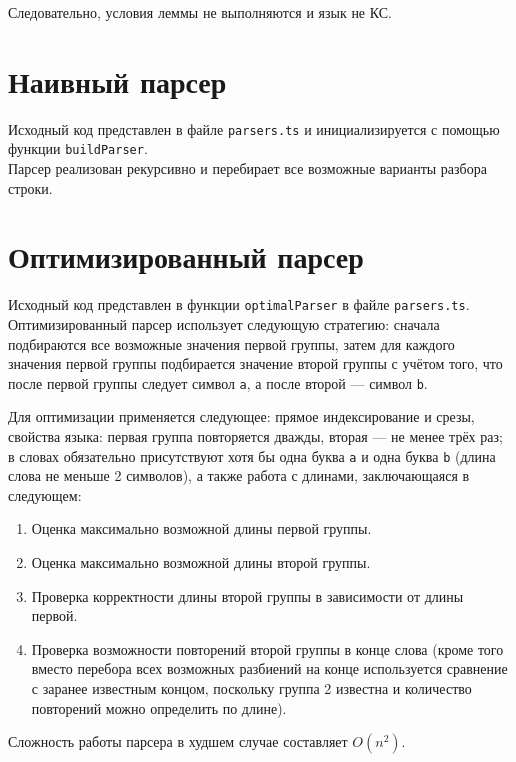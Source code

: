 \documentclass[a4paper,12pt]{article}
\begin{document}
Следовательно, условия леммы не выполняются и язык не КС.

\clearpage
\section{Наивный парсер}

Исходный код представлен в файле \texttt{parsers.ts} и инициализируется с помощью функции \texttt{buildParser}.\\

Парсер реализован рекурсивно и перебирает все возможные варианты разбора строки.

\section{Оптимизированный парсер}

Исходный код представлен в функции \texttt{optimalParser} в файле \texttt{parsers.ts}.\\

Оптимизированный парсер использует следующую стратегию: сначала подбираются все возможные значения первой группы, затем для каждого значения первой группы подбирается значение второй группы с учётом того, что после первой группы следует символ \texttt{a}, а после второй — символ \texttt{b}.

Для оптимизации применяется следующее: прямое индексирование и срезы, свойства языка: первая группа повторяется дважды, вторая — не менее трёх раз; в словах обязательно присутствуют хотя бы одна буква \texttt{a} и одна буква \texttt{b} (длина слова не меньше 2 символов), а также работа с длинами, заключающаяся в следующем:

\begin{enumerate}
\item Оценка максимально возможной длины первой группы.
\item Оценка максимально возможной длины второй группы.
\item Проверка корректности длины второй группы в зависимости от длины первой.
\item Проверка возможности повторений второй группы в конце слова (кроме того вместо перебора всех возможных разбиений на конце используется сравнение с заранее известным концом, поскольку группа 2 известна и количество повторений можно определить по длине).
\end{enumerate}

Сложность работы парсера в худшем случае составляет $O(n^2)$.
\end{document}

